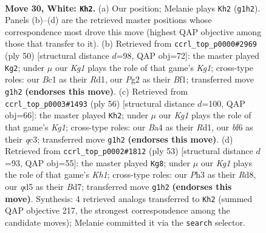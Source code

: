 \documentclass[11pt]{article}
\begin{document}
\clearpage

\begin{figure}[p]\centering
\begin{subfigure}{0.46\textwidth}\centering
\resizebox{\linewidth}{!}{%
\newchessgame
\chessboard[
  setfen={r1b5/ppp2ppk/3n1b1p/3q4/B4Q2/5P1P/PP4P1/R1B3K1 w - - 0 30},
  showmover=false,
  pgfstyle=straightmove, color=movearrow, markmove={g1-h2}
]}
\caption{}
\end{subfigure}\hfill
\begin{subfigure}{0.46\textwidth}\centering
\resizebox{\linewidth}{!}{%
\newchessgame
\chessboard[
  setfen={4r1k1/pp3pp1/1bp2n2/4q2p/8/P1P2QPP/1P3P2/2BR1BK1 w - - 3 26},
  showmover=false,
  pgfstyle=straightmove, color=movearrow, markmove={g1-g2}
]}
\caption{}
\end{subfigure}
\\[4pt]
\begin{subfigure}{0.46\textwidth}\centering
\resizebox{\linewidth}{!}{%
\newchessgame
\chessboard[
  setfen={6k1/1p1r1p2/p4bp1/3Pn2p/P6P/2q2PB1/4Q1P1/3R1BK1 w - - 2 29},
  showmover=false,
  pgfstyle=straightmove, color=movearrow, markmove={g1-h2}
]}
\caption{}
\end{subfigure}\hfill
\begin{subfigure}{0.46\textwidth}\centering
\resizebox{\linewidth}{!}{%
\newchessgame
\chessboard[
  setfen={3r3k/3bbpp1/5n1p/2p1p3/4P3/1Bq1BQ1P/R2N1PP1/6K1 b - - 0 27},
  showmover=false,
  pgfstyle=straightmove, color=movearrow, markmove={h8-g8}
]}
\caption{}
\end{subfigure}
\caption{\textbf{Move 30, White: \texttt{Kh2}.} (a) Our position; Melanie plays \texttt{Kh2} (\texttt{g1h2}). Panels (b)--(d) are the retrieved master positions whose correspondence most drove this move (highest QAP objective among those that transfer to it). (b) Retrieved from \texttt{ccrl\_top\_p0000\#2969} (ply 50) [structural distance $d$=98, QAP obj=72]: the master played \texttt{Kg2}; under $\mu$ our \emph{Kg1} plays the role of that game's \emph{Kg1}; cross-type roles: our \emph{B}c1 as their \emph{R}d1, our \emph{P}g2 as their \emph{B}f1; transferred move \texttt{g1h2} \textbf{(endorses this move)}. (c) Retrieved from \texttt{ccrl\_top\_p0003\#1493} (ply 56) [structural distance $d$=100, QAP obj=66]: the master played \texttt{Kh2}; under $\mu$ our \emph{Kg1} plays the role of that game's \emph{Kg1}; cross-type roles: our \emph{B}a4 as their \emph{R}d1, our \emph{b}f6 as their \emph{q}c3; transferred move \texttt{g1h2} \textbf{(endorses this move)}. (d) Retrieved from \texttt{ccrl\_top\_p0002\#1812} (ply 53) [structural distance $d$=93, QAP obj=55]: the master played \texttt{Kg8}; under $\mu$ our \emph{Kg1} plays the role of that game's \emph{Kh1}; cross-type roles: our \emph{P}h3 as their \emph{R}d8, our \emph{q}d5 as their \emph{B}d7; transferred move \texttt{g1h2} \textbf{(endorses this move)}. Synthesis: 4 retrieved analogs transferred to \texttt{Kh2} (summed QAP objective 217, the strongest correspondence among the candidate moves); Melanie committed it via the \texttt{search} selector.}
\label{fig:thought-m58}
\end{figure}
\end{document}
